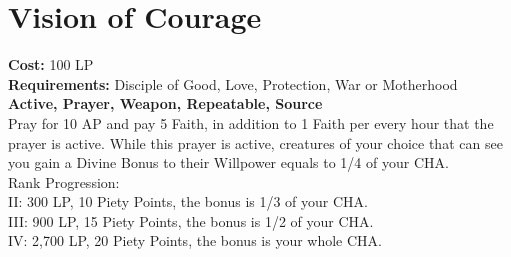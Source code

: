 \section{Vision of Courage}\label{prayer:courage}
\textbf{Cost:} 100 LP\\
\textbf{Requirements:} Disciple of Good, Love, Protection, War or Motherhood\\
\textbf{Active, Prayer, Weapon, Repeatable, Source}\\
Pray for 10 AP and pay 5 Faith, in addition to 1 Faith per every hour that the prayer is active.
While this prayer is active, creatures of your choice that can see you gain a Divine Bonus to their Willpower equals to 1/4 of your CHA.
\\
Rank Progression:\\
II: 300 LP, 10 Piety Points, the bonus is 1/3 of your CHA.\\
III: 900 LP, 15 Piety Points, the bonus is 1/2 of your CHA.\\
IV: 2,700 LP, 20 Piety Points, the bonus is your whole CHA.\\